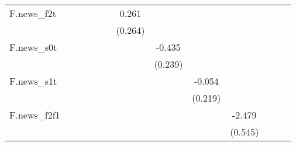 {\begin{tabular}{l*{12}{c}}
\addlinespace
F.news\_f2t  &                     &                     &                     &                     &                     &       0.261         &                     &                     &                     &                     &                     &                     \\
            &                     &                     &                     &                     &                     &     (0.264)         &                     &                     &                     &                     &                     &                     \\
\addlinespace
F.news\_s0t  &                     &                     &                     &                     &                     &                     &      -0.435\sym{*}  &                     &                     &                     &                     &                     \\
            &                     &                     &                     &                     &                     &                     &     (0.239)         &                     &                     &                     &                     &                     \\
\addlinespace
F.news\_s1t  &                     &                     &                     &                     &                     &                     &                     &      -0.054         &                     &                     &                     &                     \\
            &                     &                     &                     &                     &                     &                     &                     &     (0.219)         &                     &                     &                     &                     \\
\addlinespace
F.news\_f2f1 &                     &                     &                     &                     &                     &                     &                     &                     &      -2.479\sym{***}&                     &                     &                     \\
            &                     &                     &                     &                     &                     &                     &                     &                     &     (0.545)         &                     &                     &                     \\

\end{tabular}}
